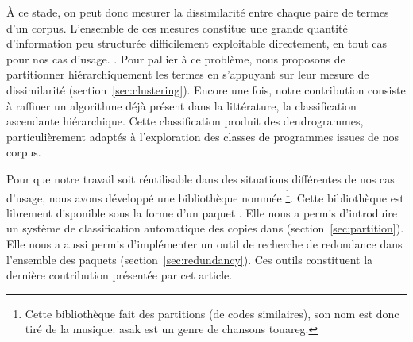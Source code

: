 À ce stade, on peut donc mesurer la dissimilarité
%
entre chaque paire de termes d'un corpus. L'ensemble de ces mesures
constitue une grande quantité d'information peu structurée
difficilement exploitable directement, en tout cas pour nos cas
d'usage. . 
%
Pour
pallier à ce problème, nous proposons de partitionner hiérarchiquement
les termes en s'appuyant sur leur mesure de dissimilarité
(section~\ref{sec:clustering}). Encore une fois, notre contribution
consiste à raffiner un algorithme déjà présent dans la littérature, la
classification ascendante hiérarchique. Cette classification produit
des dendrogrammes, particulièrement adaptés à l'exploration des
classes de programmes issues de nos corpus.

Pour que notre travail soit réutilisable dans des situations
différentes de nos cas d'usage, nous avons développé une bibliothèque
nommée {\Asak}\footnote{Cette bibliothèque fait des partitions (de codes similaires), son nom est donc tiré de la musique: asak est un genre de chansons touareg.}.
Cette bibliothèque est librement disponible sous la forme d'un paquet {\Opam}.
Elle nous a permis d'introduire un système de classification automatique
des copies dans {\LearnOCaml} (section~\ref{sec:partition}). Elle nous a
aussi permis d'implémenter un outil de recherche de redondance dans
l'ensemble des paquets {\Opam} (section~\ref{sec:redundancy}). Ces outils
constituent la dernière contribution présentée par cet article.
